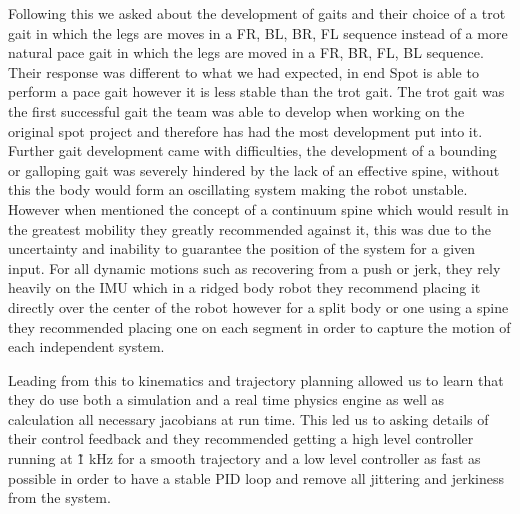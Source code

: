        Following this we asked about the development of gaits and their choice of a trot gait in which the legs are moves in a FR, BL, BR, FL sequence instead of a more natural pace gait in which the legs are moved in a FR, BR, FL, BL sequence. Their response was different to what we had expected, in end Spot is able to perform a pace gait however it is less stable than the trot gait. The trot gait was the first successful gait the team was able to develop when working on the original spot project and therefore has had the most development put into it. Further gait development came with difficulties, the development of a bounding or galloping gait was severely hindered by the lack of an effective spine, without this the body would form an oscillating system making the robot unstable. However when mentioned the concept of a continuum spine which would result in the greatest mobility they greatly recommended against it, this was due to the uncertainty and inability to guarantee the position of the system for a given input. For all dynamic motions such as recovering from a push or jerk, they rely heavily on the IMU which in a ridged body robot they recommend placing it directly over the center of the robot however for a split body or one using a spine they recommended placing one on each segment in order to capture the motion of each independent system. 
        
        Leading from this to kinematics and trajectory planning allowed us to learn that they do use both a simulation and a real time physics engine as well as calculation all necessary jacobians at run time. This led us to asking details of their control feedback and they recommended getting a high level controller running at \~1 kHz for a smooth trajectory and a low level controller as fast as possible in order to have a stable PID loop and remove all jittering and jerkiness from the system. 
    
